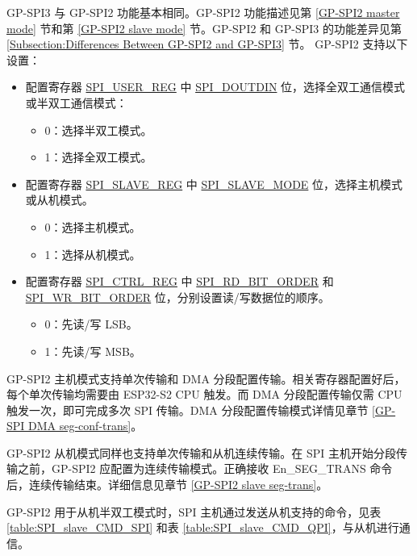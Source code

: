 \documentclass[main\_\_CN.tex]{subfiles}
\begin{document}
GP-SPI3 与 GP-SPI2 功能基本相同。GP-SPI2 功能描述见第 \ref{GP-SPI2 master mode} 节和第 \ref{GP-SPI2 slave mode} 节。GP-SPI2 和 GP-SPI3 的功能差异见第 \ref{Subsection:Differences Between GP-SPI2 and GP-SPI3} 节。
GP-SPI2 支持以下设置：

\begin{itemize}
    \item 配置寄存器 \hyperref[regdesc:SPIUSERREG]{SPI\_USER\_REG} 中 \hyperref[fielddesc:SPIDOUTDIN]{SPI\_DOUTDIN} 位，选择全双工通信模式或半双工通信模式：
    \begin{itemize}
        \item 0：选择半双工模式。
        \item 1：选择全双工模式。
    \end{itemize}
    \item 配置寄存器 \hyperref[regdesc:SPISLAVEREG]{SPI\_SLAVE\_REG} 中 \hyperref[fielddesc:SPISLAVEMODE]{SPI\_SLAVE\_MODE} 位，选择主机模式或从机模式。
    \begin{itemize}
        \item 0：选择主机模式。
        \item 1：选择从机模式。
    \end{itemize}
    \item 配置寄存器 \hyperref[regdesc:SPICTRLREG]{SPI\_CTRL\_REG} 中 \hyperref[fielddesc:SPIRDBITORDER]{SPI\_RD\_BIT\_ORDER} 和 \hyperref[fielddesc:SPIWRBITORDER]{SPI\_WR\_BIT\_ORDER} 位，分别设置读/写数据位的顺序。
    \begin{itemize}
        \item 0：先读/写 LSB。
        \item 1：先读/写 MSB。
    \end{itemize}
\end{itemize}

GP-SPI2 主机模式支持单次传输和 DMA 分段配置传输。相关寄存器配置好后，每个单次传输均需要由 ESP32-S2 CPU 触发。而 DMA 分段配置传输仅需 CPU 触发一次，即可完成多次 SPI 传输。DMA 分段配置传输模式详情见章节 \ref{GP-SPI DMA seg-conf-trans}。

GP-SPI2 从机模式同样也支持单次传输和从机连续传输。在 SPI 主机开始分段传输之前，GP-SPI2 应配置为连续传输模式。正确接收 En\_SEG\_TRANS 命令后，连续传输结束。详细信息见章节 \ref{GP-SPI2 slave seg-trans}。

GP-SPI2 用于从机半双工模式时，SPI 主机通过发送从机支持的命令，见表 \ref{table:SPI_slave_CMD_SPI} 和表 \ref{table:SPI_slave_CMD_QPI}，与从机进行通信。
\end{document}

